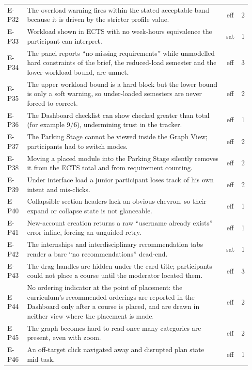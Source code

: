 \begin{longtable}{p{1.6cm}p{9.6cm}cc}
    E-P32 & The overload warning fires within the stated acceptable band because it is driven by the stricter profile value. & eff & 2 \\
    E-P33 & Workload shown in ECTS with no week-hours equivalence the participant can interpret. & sat & 1 \\
    E-P34 & The panel reports \enquote{no missing requirements} while unmodelled hard constraints of the brief, the reduced-load semester and the lower workload bound, are unmet. & eff & 3 \\
    E-P35 & The upper workload bound is a hard block but the lower bound is only a soft warning, so under-loaded semesters are never forced to correct. & eff & 2 \\
    E-P36 & The Dashboard checklist can show checked greater than total (for example 9/6), undermining trust in the tracker. & eff & 1 \\
    E-P37 & The Parking Stage cannot be viewed inside the Graph View; participants had to switch modes. & eff & 2 \\
    E-P38 & Moving a placed module into the Parking Stage silently removes it from the ECTS total and from requirement counting. & eff & 2 \\
    E-P39 & Under interface load a junior participant loses track of his own intent and mis-clicks. & eff & 2 \\
    E-P40 & Collapsible section headers lack an obvious chevron, so their expand or collapse state is not glanceable. & eff & 1 \\
    E-P41 & New-account creation returns a raw \enquote{username already exists} error inline, forcing an unguided retry. & eff & 1 \\
    E-P42 & The internships and interdisciplinary recommendation tabs render a bare \enquote{no recommendations} dead-end. & sat & 1 \\
    E-P43 & The drag handles are hidden under the card title; participants could not place a course until the moderator located them. & eff & 3 \\
    E-P44 & No ordering indicator at the point of placement: the curriculum's recommended orderings are reported in the Dashboard only after a course is placed, and are drawn in neither view where the placement is made. & eff & 2 \\
    E-P45 & The graph becomes hard to read once many categories are present, even with zoom. & eff & 2 \\
    E-P46 & An off-target click navigated away and disrupted plan state mid-task. & eff & 1 \\

\end{longtable}
